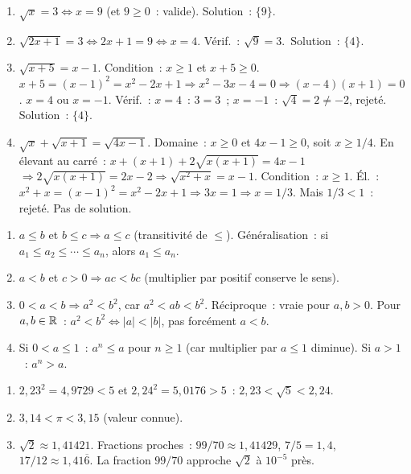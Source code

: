 
\begin{enumerate}
  \item $\sqrt{x}=3 \Leftrightarrow x=9$ (et $9\geq0$~: valide). Solution~: $\{9\}$.
  \item $\sqrt{2x+1}=3 \Leftrightarrow 2x+1=9 \Leftrightarrow x=4$.
        V\'erif.~: $\sqrt{9}=3$.\checkmark\ Solution~: $\{4\}$.
  \item $\sqrt{x+5}=x-1$. Condition~: $x\geq1$ et $x+5\geq0$.
        $x+5=(x-1)^2=x^2-2x+1 \Rightarrow x^2-3x-4=0 \Rightarrow (x-4)(x+1)=0$.
        $x=4$ ou $x=-1$. V\'erif.~: $x=4$~: $3=3$\checkmark~; $x=-1$~: $\sqrt{4}=2\ne-2$, rejet\'e.
        Solution~: $\{4\}$.
  \item $\sqrt{x}+\sqrt{x+1}=\sqrt{4x-1}$.
        Domaine~: $x\geq0$ et $4x-1\geq0$, soit $x\geq1/4$.
        En \'elevant au carr\'e~: $x+(x+1)+2\sqrt{x(x+1)}=4x-1$
        $\Rightarrow 2\sqrt{x(x+1)}=2x-2 \Rightarrow \sqrt{x^2+x}=x-1$.
        Condition~: $x\geq1$. \'El.~: $x^2+x=(x-1)^2=x^2-2x+1 \Rightarrow 3x=1 \Rightarrow x=1/3$.
        Mais $1/3<1$~: rejet\'e. Pas de solution.
\end{enumerate}


\begin{enumerate}
  \item $a\leq b$ et $b\leq c \Rightarrow a\leq c$ (transitivit\'e de $\leq$).
        G\'en\'eralisation~: si $a_1\leq a_2\leq\cdots\leq a_n$, alors $a_1\leq a_n$.
  \item $a<b$ et $c>0 \Rightarrow ac<bc$ (multiplier par positif conserve le sens).
  \item $0<a<b \Rightarrow a^2<b^2$, car $a^2<ab<b^2$. R\'eciproque~: vraie pour $a,b>0$.
        Pour $a,b\in\mathbb{R}$~: $a^2<b^2\Leftrightarrow |a|<|b|$, pas forc\'ement $a<b$.
  \item Si $0<a\leq1$~: $a^n\leq a$ pour $n\geq1$ (car multiplier par $a\leq1$
        diminue). Si $a>1$~: $a^n>a$.
\end{enumerate}


\begin{enumerate}
  \item $2{,}23^2=4{,}9729<5$ et $2{,}24^2=5{,}0176>5$~:
        $2{,}23<\sqrt{5}<2{,}24$.
  \item $3{,}14<\pi<3{,}15$ (valeur connue).
  \item $\sqrt{2}\approx1{,}41421$. Fractions proches~: $99/70\approx1{,}41429$,
        $7/5=1{,}4$, $17/12\approx1{,}41\overline{6}$.
        La fraction $99/70$ approche $\sqrt{2}$ \`a $10^{-5}$ pr\`es.
\end{enumerate}

